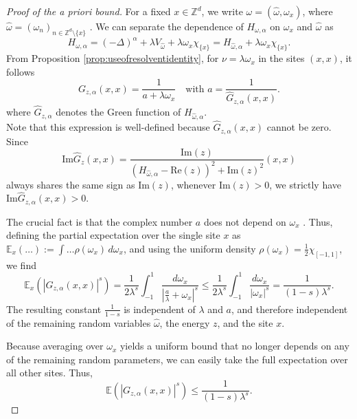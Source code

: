 \documentclass[11pt, a4paper, UKenglish, oneside]{book}
\theoremstyle{plain}
\theoremstyle{remark}
\theoremstyle{definition}
\numberwithin{equation}{section}
\numberwithin{theorem}{section}
\begin{document}
\begin{proof}[Proof of the a priori bound]
For a fixed $x \in \mathbb{Z}^d$, we write $\omega = (\hat{\omega}, \omega_x)$, where $\hat{\omega}=(\omega_n)_{n \in \mathbb{Z}^d \setminus \{x\}}$ . We can separate the dependence of $H_{\omega,\alpha}$ on $\omega_x$ and $\hat{\omega}$ as
\[
H_{\omega,\alpha} = (-\Delta)^\alpha + \lambda V_{\hat{\omega}} + \lambda \omega_x \chi_{\{x\}} = H_{\hat{\omega},\alpha} +  \lambda \omega_x \chi_{\{x\}}.
\]
From Proposition \ref{prop:useofresolventidentity}, for $\nu =\lambda \omega_x$ in the sites $(x,x)$, it follows
\begin{equation}
 G_{z,\alpha}(x, x) = \frac{1}{a + \lambda \omega_x} \quad \text{with } a = \frac{1}{ \hat{G}_{z,\alpha}(x, x)}.
\end{equation}
where $ \hat{G}_{z,\alpha}$ denotes the Green function of $H_{\hat{\omega},\alpha}$.\\
Note that this expression is well-defined because $ \hat{G}_{z,\alpha}(x, x)$ cannot be zero. Since 
\begin{equation} \label{eq:imG}
\mathrm{Im} \hat{G}_z(x,x) = \frac{\mathrm{Im}(z)}{(H_{\hat{\omega},\alpha}-\mathrm{Re}(z))^2 + \mathrm{Im}(z)^2}(x,x)
\end{equation}
always shares the same sign as $\mathrm{Im}(z)$, whenever $\mathrm{Im}(z) > 0$, we strictly have $\mathrm{Im}  \hat{G}_{z,\alpha}(x, x) > 0$.

The crucial fact is that the complex number $a$ does not depend on $\omega_x$ . Thus, defining the partial expectation over the single site $x$ as $\mathbb{E}_x(\dots) := \int \dots \rho(\omega_x)\, d\omega_x$, and using the uniform density $\rho(\omega_x) = \frac{1}{2} \chi_{[-1,1]}$, we find 
\begin{equation}
\mathbb{E}_x(| G_{z,\alpha}(x, x)|^s) = \frac{1}{2 \lambda^s} \int_{-1}^{1} \frac{d\omega_x}{\left|\frac{a}{\lambda} + \omega_x\right|^s} \le \frac{1}{2 \lambda^s} \int_{-1}^{1} \frac{d\omega_x}{|\omega_x|^s} = \frac{1}{(1-s)\lambda^s}.
\end{equation}
The resulting constant $\frac{1}{1-s}$ is independent of $\lambda$ and $a$, and therefore independent of the remaining random variables $\hat{\omega}$, the energy $z$, and the site $x$.

Because averaging over $\omega_x$ yields a uniform bound that no longer depends on any of the remaining random parameters, we can easily take the full expectation over all other sites. Thus,
$$ \mathbb{E}(|G_{z,\alpha}(x, x)|^s) \le \frac{1}{(1-s)\lambda^s}. $$
\end{proof}
\end{document}
